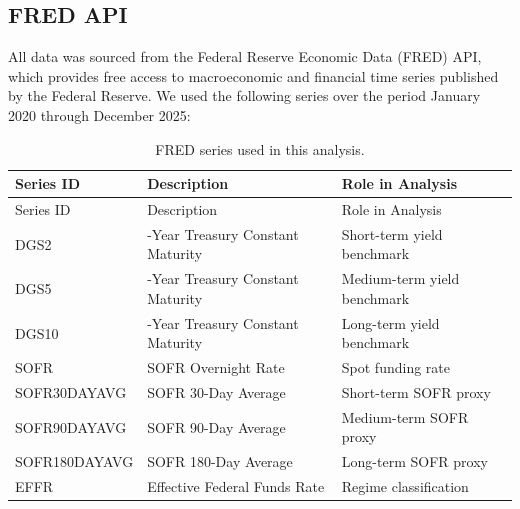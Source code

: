\documentclass[
  11pt,
  letterpaper,
  DIV=11,
  numbers=noendperiod]{scrartcl}
\begin{document}
\subsection{FRED API}\label{fred-api}

All data was sourced from the Federal Reserve Economic Data (FRED) API,
which provides free access to macroeconomic and financial time series
published by the Federal Reserve. We used the following series over the
period January 2020 through December 2025:

\begin{longtable}[]{@{}
  >{\raggedright\arraybackslash}p{}
  >{\raggedright\arraybackslash}p{}
  >{\raggedright\arraybackslash}p{}@{}}
\caption{FRED series used in this
analysis.}\label{tbl-series}\tabularnewline
\toprule\noalign{}
\begin{minipage}[b]{\linewidth}\raggedright
Series ID
\end{minipage} & \begin{minipage}[b]{\linewidth}\raggedright
Description
\end{minipage} & \begin{minipage}[b]{\linewidth}\raggedright
Role in Analysis
\end{minipage} \\
\midrule\noalign{}
\endfirsthead
\toprule\noalign{}
\begin{minipage}[b]{\linewidth}\raggedright
Series ID
\end{minipage} & \begin{minipage}[b]{\linewidth}\raggedright
Description
\end{minipage} & \begin{minipage}[b]{\linewidth}\raggedright
Role in Analysis
\end{minipage} \\
\midrule\noalign{}
\endhead
\bottomrule\noalign{}
\endlastfoot
DGS2 & 2-Year Treasury Constant Maturity & Short-term yield benchmark \\
DGS5 & 5-Year Treasury Constant Maturity & Medium-term yield
benchmark \\
DGS10 & 10-Year Treasury Constant Maturity & Long-term yield
benchmark \\
SOFR & SOFR Overnight Rate & Spot funding rate \\
SOFR30DAYAVG & SOFR 30-Day Average & Short-term SOFR proxy \\
SOFR90DAYAVG & SOFR 90-Day Average & Medium-term SOFR proxy \\
SOFR180DAYAVG & SOFR 180-Day Average & Long-term SOFR proxy \\
EFFR & Effective Federal Funds Rate & Regime classification \\
\end{longtable}
\end{document}
